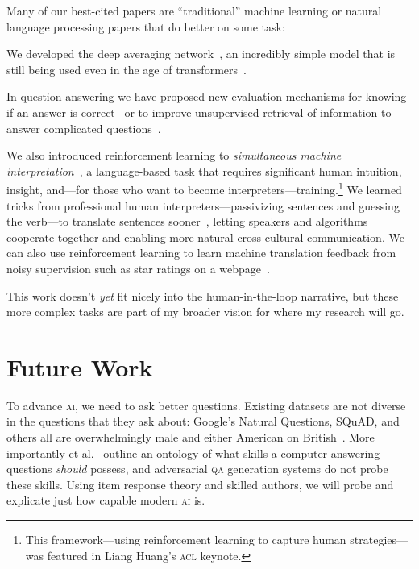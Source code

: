 \documentclass[11pt]{amsart}
\newcommand{\abr}[1]{\textsc{#1}}
\newcommand{\newcite}[2]{\capitalisewords{#1} et al.~\cite{#1-#2}}
\begin{document}
Many of our best-cited papers are ``traditional'' machine learning or natural language processing papers that do better on some task:
%
\begin{itemize*}
\item We developed the deep averaging network~\cite[\abr{dan}]{iyyer-15}, an
incredibly simple model that is still being used even in the age of
transformers~\cite{ye-22}.

\item In question answering we have proposed new evaluation
mechanisms for knowing if an answer is correct~\cite{si-21} or to
improve unsupervised retrieval of information to answer complicated
questions~\cite{elgohary-19,zhao-20,shi-20}.

\item We also introduced reinforcement learning to \emph{simultaneous
machine interpretation}~\cite{Grissom:He:Boyd-Graber:Morgan-2014}, a
  language-based task that requires significant human intuition,
  insight, and---for those who want to become
  interpreters---training.\footnote{This framework---using
  reinforcement learning to capture human strategies---was featured in
  Liang Huang's \abr{acl} keynote.} We learned tricks from
  professional human interpreters---passivizing sentences and guessing
  the verb---to translate sentences sooner~\cite{He-15}, letting
  speakers and algorithms cooperate together and enabling more natural
  cross-cultural communication.  We can also use reinforcement
  learning to learn machine translation feedback from noisy
  supervision such as star ratings on a webpage~\cite{nguyen-17}.
\end{itemize*}

This work doesn't \emph{yet} fit nicely into the human-in-the-loop
narrative, but these more complex tasks are part of my broader vision
for where my research will go.

\section{Future Work}

To advance \abr{ai}, we need to ask better questions.
%
Existing datasets are not diverse in the questions that they ask
about: Google's Natural Questions, SQuAD, and others all are
overwhelmingly male and either American on British~\cite{gor-21}.
%
More importantly \newcite{rogers}{22} outline an ontology of what skills a computer
answering questions \emph{should} possess, and adversarial \abr{qa} generation
systems do not probe these skills.
%
Using item response theory and skilled authors, we will probe and
explicate just how capable modern \abr{ai} is.
\end{document}
